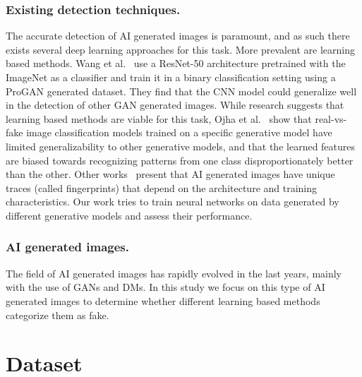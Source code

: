 \documentclass[runningheads]{llncs}
\begin{document}
\subsubsection{Existing detection techniques.} The accurate detection of AI generated images is paramount, and as such there exists several deep learning approaches for this task. More prevalent are learning based methods. Wang et al.~\cite{wang2019cnngenerated} use a ResNet-50 architecture pretrained with the ImageNet as a classifier and train it in a binary classification setting using a ProGAN generated dataset. They find that the CNN model could generalize well in the detection of other GAN generated images. While research suggests that learning based methods are viable for this task, Ojha et al.~\cite{ojha2023towards} show that real-vs-fake image classification models trained on a specific generative model have limited generalizability to other generative models, and that the learned features are biased towards recognizing patterns from one class disproportionately better than the other. Other works~\cite{francesco2019fingerprint, ning2019fingerprint} present that AI generated images have unique traces (called fingerprints) that depend on the architecture and training characteristics. Our work tries to train neural networks on data generated by different generative models and assess their performance.

\subsubsection{AI generated images.} The field of AI generated images has rapidly evolved in the last years, mainly with the use of GANs and DMs. In this study we focus on this type of AI generated images to determine whether different learning based methods categorize them as fake.

%
%
\section{Dataset}
\end{document}
